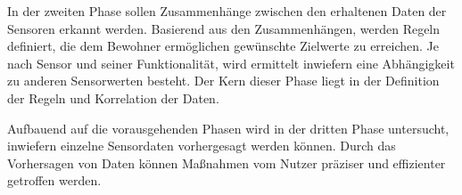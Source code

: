 In der zweiten Phase sollen Zusammenhänge zwischen den erhaltenen Daten der Sensoren erkannt werden. Basierend aus den Zusammenhängen, werden Regeln definiert, die dem Bewohner ermöglichen gewünschte Zielwerte zu erreichen. Je nach Sensor und seiner Funktionalität, wird ermittelt inwiefern eine Abhängigkeit zu anderen Sensorwerten besteht. Der Kern dieser Phase liegt in der Definition der Regeln und Korrelation der Daten.

Aufbauend auf die vorausgehenden Phasen wird in der dritten Phase untersucht, inwiefern einzelne Sensordaten vorhergesagt werden können. Durch das Vorhersagen von Daten können Maßnahmen vom Nutzer präziser und effizienter getroffen werden. 
